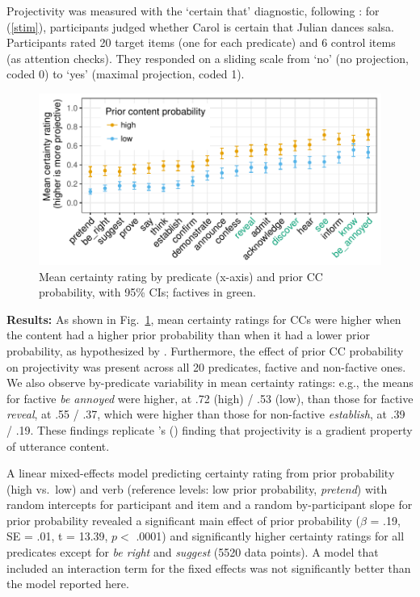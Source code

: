 \documentclass[12pt,fleqn]{article}
\newcommand{\citetpos}[1]{\citeauthor{#1}'s (\citeyear{#1})}
\newcommand{\6}{\mbox{$[\hspace*{-.6mm}[$}}
\newcommand{\9}{\mbox{$]\hspace*{-.6mm}]$}}
\begin{document}
\noindent Projectivity was measured with the `certain that' diagnostic, following \citealt{tbd-variability}: for (\ref{stim}), participants judged whether Carol is certain that Julian dances salsa. Participants rated 20 target items (one for each predicate) and 6 control items (as attention checks). They responded on a sliding scale from `no' (no projection, coded 0) to `yes' (maximal projection, coded 1).
\begin{figure}
\centering
\includegraphics[width=.45\paperwidth]{../results/3-projectivity/graphs/means-projectivity-by-predicate-and-facttype}
\caption{Mean certainty rating by predicate (x-axis) and prior CC probability, with 95\% CIs; factives in green.}\label{f-proj}
\end{figure}

\noindent
{\bf Results:} As shown in Fig.~\ref{f-proj}, mean certainty ratings for CCs were higher when the content had a higher prior probability than when it had a lower prior probability, as hypothesized by \citet{tbd-variability}. Furthermore, the effect of prior CC probability on projectivity was present across all 20 predicates, factive and non-factive ones. We also observe by-predicate variability in mean certainty ratings:  e.g., the means for factive {\em be annoyed} were higher, at .72 (high) / .53 (low), than those for factive {\em reveal}, at .55 / .37, which were higher than those for non-factive {\em establish}, at .39 / .19. These findings replicate \citetpos{tbd-variability} finding that projectivity is a gradient property of utterance content.

A linear mixed-effects model predicting certainty rating from prior probability (high vs.\ low) and verb (reference levels: low prior probability, {\em pretend}) with random intercepts for participant and item and a random by-participant slope for prior probability revealed a significant main effect of prior probability ($\beta$ = .19, SE = .01, t = 13.39, $p <$ .0001) and significantly higher certainty ratings for all predicates except for {\em be right} and {\em suggest} (5520 data points). A model that included an interaction term for the fixed effects was not significantly better than the model reported here.
\end{document}
